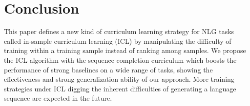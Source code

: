 \section{Conclusion}

This paper defines a new kind of curriculum learning strategy for NLG tasks called in-sample curriculum learning (ICL) by manipulating the difficulty of training within a training sample instead of ranking among samples. We propose the ICL algorithm with the sequence completion curriculum which boosts the performance of strong baselines on a wide range of tasks, showing the effectiveness and strong generalization ability of our approach. More training strategies under ICL digging the inherent difficulties of generating a language sequence are expected in the future.



